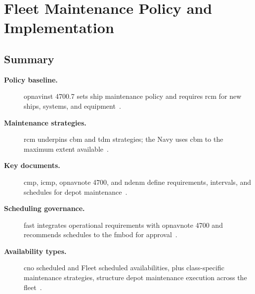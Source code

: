 \documentclass[../main.tex]{subfiles}
\begin{document}
\section{Fleet Maintenance Policy and Implementation}

\subsection{Summary}
\begin{description}
  \item[\textbf{Policy baseline.}] \ac{opnavinst} 4700.7 sets ship maintenance policy and requires \ac{rcm} for new ships, systems, and equipment~\autocite{OPNAVINST4700-7N,edo-4-1-3-fleet-maint-policy-2025}.
  \item[\textbf{Maintenance strategies.}] \ac{rcm} underpins \ac{cbm} and \ac{tdm} strategies; the Navy uses \ac{cbm} to the maximum extent available~\autocite{OPNAVINST4700-7N,edo-4-1-3-fleet-maint-policy-2025}.
  \item[\textbf{Key documents.}] \ac{cmp}, \ac{icmp}, \ac{opnavnote} 4700, and \ac{ndenm} define requirements, intervals, and schedules for depot maintenance~\autocite{OPNAVINST4700-7N,COMFLTFORCOMINST4790-3,edo-4-1-3-fleet-maint-policy-2025}.
  \item[\textbf{Scheduling governance.}] \ac{fast} integrates operational requirements with \ac{opnavnote} 4700 and recommends schedules to the \ac{fmbod} for approval~\autocite{OPNAVINST4700-7N,COMFLTFORCOMINST4790-3,edo-4-1-3-fleet-maint-policy-2025}.
  \item[\textbf{Availability types.}] \ac{cno} scheduled and Fleet scheduled availabilities, plus class-specific maintenance strategies, structure depot maintenance execution across the fleet~\autocite{OPNAVINST4700-7N,COMFLTFORCOMINST4790-3,edo-4-1-3-fleet-maint-policy-2025}.
\end{description}
\end{document}
